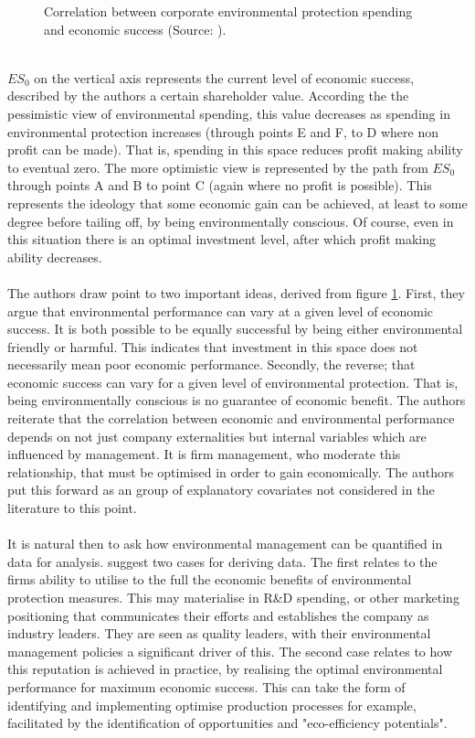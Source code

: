 {\begin{figure}[h]
\caption{Correlation between corporate environmental protection spending and economic success (Source: \cite{schaltegger2002link}).}
\label{ch3_successAndEnviornment}
\end{figure}\\
$ES_0$ on the vertical axis represents the current level of economic success, described by the authors a certain shareholder value. According the the pessimistic view of environmental spending, this value decreases as spending in environmental protection increases (through points E and F, to D where non profit can be made). That is, spending in this space reduces profit making ability to eventual zero. The more optimistic view is represented by the path from $ES_0$ through points A and B to point C (again where no profit is possible). This represents the ideology that some economic gain can be achieved, at least to some degree before tailing off, by being environmentally conscious. Of course, even in this situation there is an optimal investment level, after which profit making ability decreases. \\\\
The authors draw point to two important ideas, derived from figure \ref{ch3_successAndEnviornment}. First, they argue that environmental performance can vary at a given level of economic success. It is both possible to be equally successful by being either environmental friendly or harmful. This indicates that investment in this space does not necessarily mean poor economic performance. Secondly, the reverse; that economic success can vary for a given level of environmental protection. That is, being environmentally conscious is no guarantee of economic benefit. The authors reiterate that the correlation between economic and environmental performance depends on not just company externalities but internal variables which are influenced by management. It is firm management, who moderate this relationship, that must be optimised in order to gain economically. The authors put this forward as an group of explanatory covariates not considered in the literature to this point. \\\\
It is natural then to ask how environmental management can be quantified in data for analysis. \cite{schaltegger2002link} suggest two cases for deriving data. The first relates to the firms ability to utilise to the full the economic benefits of environmental protection measures. This may materialise in R\&D spending, or other marketing positioning that communicates their efforts and establishes the company as industry leaders. They are seen as quality leaders, with their environmental management policies a significant driver of this. The second case relates to how this reputation is achieved in practice, by realising the optimal environmental performance for maximum economic success. This can take the form of identifying and implementing optimise production processes for example, facilitated by the identification of opportunities and "eco-efficiency potentials". \\\\
}
